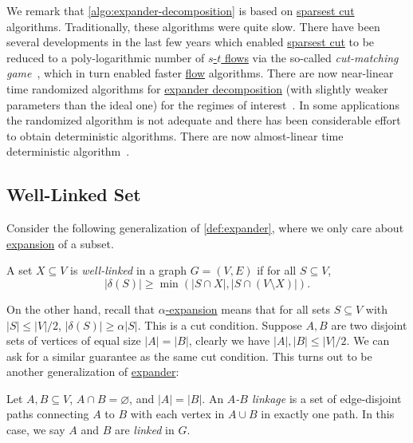 We remark that \autoref{algo:expander-decomposition} is based on \hyperref[prb:sparsest-cut]{sparsest cut} algorithms. Traditionally, these algorithms were quite slow. There have been several developments in the last few years which enabled \hyperref[prb:sparsest-cut]{sparsest cut} to be reduced to a poly-logarithmic number of \hyperref[prb:s-t-max-flow]{\(s\)-\(t\) flows} via the so-called \emph{cut-matching game}~\cite{khandekar2009graph,orecchia2008partitioning}, which in turn enabled faster \hyperref[def:flow]{flow} algorithms. There are now near-linear time randomized algorithms for \hyperref[def:expander-decomposition]{expander decomposition} (with slightly weaker parameters than the ideal one) for the regimes of interest~\cite{saranurak2019expander}. In some applications the randomized algorithm is not adequate and there has been considerable effort to obtain deterministic algorithms. There are now almost-linear time deterministic algorithm~\cite{chuzhoy2020deterministic,saranurak2021deterministic}.

\subsection{Well-Linked Set}
Consider the following generalization of \autoref{def:expander}, where we only care about \hyperref[def:expansion]{expansion} of a subset.

\begin{definition}\label{def:well-linked}
	A set \(X \subseteq V\) is \emph{well-linked} in a graph \(G = (V, E)\) if for all \(S \subseteq V\),
	\[
		\lvert \delta (S) \rvert
		\geq \min (\lvert S \cap X \rvert , \lvert S \cap (V \setminus X) \rvert ).
	\]
\end{definition}

On the other hand, recall that \hyperref[def:expansion]{\(\alpha \)-expansion} means that for all sets \(S \subseteq V\) with \(\lvert S \rvert \leq \lvert V \rvert / 2\), \(\lvert \delta (S) \rvert \geq \alpha \lvert S \rvert \). This is a cut condition. Suppose \(A, B\) are two disjoint sets of vertices of equal size \(\lvert A \rvert = \lvert B \rvert \), clearly we have \(\lvert A \rvert , \lvert B \rvert \leq \lvert V \rvert / 2\). We can ask for a similar guarantee as the same cut condition. This turns out to be another generalization of \hyperref[def:expander]{expander}:

\begin{definition}[Linkage]\label{def:linkage}
	Let \(A, B \subseteq V\), \(A \cap B = \varnothing \), and \(\lvert A \rvert = \lvert B \rvert \). An \emph{\(A\)-\(B\) linkage} is a set of edge-disjoint paths connecting \(A\) to \(B\) with each vertex in \(A \cup B\) in exactly one path. In this case, we say \(A\) and \(B\) are \emph{linked} in \(G\).
\end{definition}

